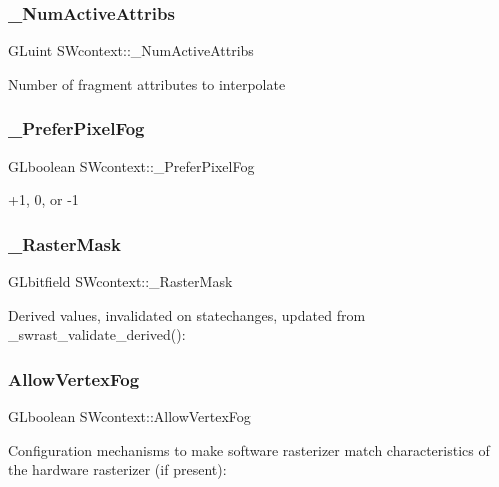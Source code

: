 \subsubsection{\texorpdfstring{\+\_\+\+Num\+Active\+Attribs}{\_NumActiveAttribs}}
{\footnotesize\ttfamily G\+Luint S\+Wcontext\+::\+\_\+\+Num\+Active\+Attribs}

Number of fragment attributes to interpolate \mbox{\label{struct_s_wcontext_a756b218b6199d933c784a1ce6e7878d8}} 
\subsubsection{\texorpdfstring{\+\_\+\+Prefer\+Pixel\+Fog}{\_PreferPixelFog}}
{\footnotesize\ttfamily G\+Lboolean S\+Wcontext\+::\+\_\+\+Prefer\+Pixel\+Fog}

+1, 0, or -\/1 \mbox{\label{struct_s_wcontext_ad2791c263e50ab089622ccef8cf998d1}} 
\subsubsection{\texorpdfstring{\+\_\+\+Raster\+Mask}{\_RasterMask}}
{\footnotesize\ttfamily G\+Lbitfield S\+Wcontext\+::\+\_\+\+Raster\+Mask}

Derived values, invalidated on statechanges, updated from \+\_\+swrast\+\_\+validate\+\_\+derived()\+: \mbox{\label{struct_s_wcontext_af59816052a82b37da0e8e1152715959a}} 
\subsubsection{\texorpdfstring{Allow\+Vertex\+Fog}{AllowVertexFog}}
{\footnotesize\ttfamily G\+Lboolean S\+Wcontext\+::\+Allow\+Vertex\+Fog}

Configuration mechanisms to make software rasterizer match characteristics of the hardware rasterizer (if present)\+: \mbox{\label{struct_s_wcontext_ad06b09a06a642e3009043b80227f68ba}} 
